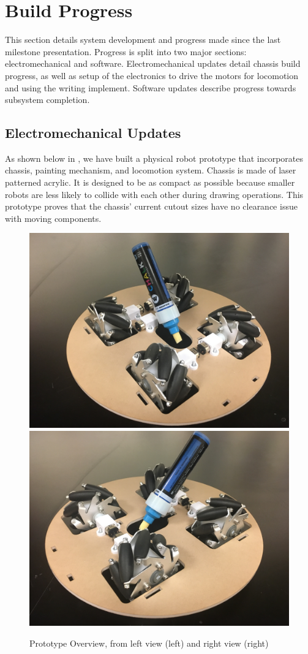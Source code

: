 
\section{Build Progress}
\label{sec:build_progress}

This section details system development and progress made since the last milestone presentation. Progress is split into two major sections: electromechanical and software. Electromechanical updates detail chassis build progress, as well as setup of the electronics to drive the motors for locomotion and using the writing implement. Software updates describe progress towards subsystem completion.

\subsection{Electromechanical Updates}
\label{sec:electromechanical_progress}
As shown below in , we have built a physical robot prototype that incorporates chassis, painting mechanism, and locomotion system. Chassis is made of laser patterned acrylic. It is designed to be as compact as possible because smaller robots are less likely to collide with each other during drawing operations. This prototype proves that the chassis’ current cutout sizes have no clearance issue with moving components.

\begin{figure}[h!]
\centering
\includegraphics[width=0.49\columnwidth]{CAD/full_system_1.jpeg}
\includegraphics[width=0.49\columnwidth]{CAD/full_system_2.jpeg}
\label{fig:em1}
\caption{Prototype Overview, from left view (left) and right view (right)}
\end{figure}

